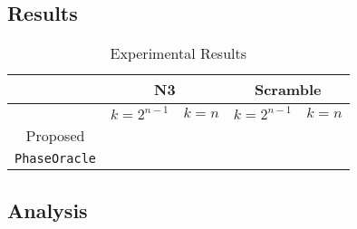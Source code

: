 \subsection{Results}
\label{Exp:Res}

\begin{table}[t]
  \begin{center}
    \scalebox{1.0} {
      \begin{tabular}{c|c|c|c|c}\hline
                             & \multicolumn{2}{c|}{N3} & \multicolumn{2}{c}{Scramble}\\\hline
                             & $k=2^{n-1}$ & $k=n$    & $k=2^{n-1}$  & $k=n$        \\\hline
        Proposed             &             &          &             &               \\\hline
        \texttt{PhaseOracle} &             &          &             &               \\\hline
      \end{tabular}
    }
  \end{center}
  \caption{Experimental Results}
  \label{table-results}
\end{table}

\subsection{Analysis}
\label{Exp:An}
